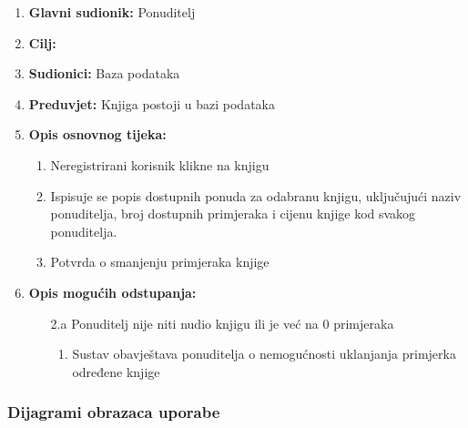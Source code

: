 \noindent {}
\begin{enumerate}
	
	\item \textbf{Glavni sudionik: } Ponuditelj
	\item  \textbf{Cilj:} 
	\item  \textbf{Sudionici:} Baza podataka
	\item  \textbf{Preduvjet:} Knjiga postoji u bazi podataka
	\item  \textbf{Opis osnovnog tijeka:}
	
	\begin{enumerate}
		
		\item Neregistrirani korisnik klikne na knjigu 
		\item Ispisuje se popis dostupnih ponuda za odabranu knjigu, uključujući naziv ponuditelja, broj dostupnih primjeraka i cijenu knjige kod svakog ponuditelja.
		\item Potvrda o smanjenju primjeraka knjige 
		
	\end{enumerate}
	
	\item  \textbf{Opis mogućih odstupanja:}
	
	\item[] \begin{enumerate}
		
		\item[2.a] Ponuditelj nije niti nudio knjigu ili je već na 0 primjeraka 
		\item[] \begin{enumerate}
			
			\item Sustav obavještava ponuditelja o nemogućnosti uklanjanja primjerka određene knjige
			
		\end{enumerate}
		
	\end{enumerate}
	
\end{enumerate}

\subsubsection{Dijagrami obrazaca uporabe}


